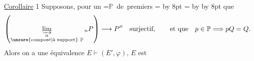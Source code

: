 \uline{Corollaire} 1 Supposons, pour un \begingroup
{}=\hbox{$\mathbb{P}$ de  premiers}
= \advance{} by 8pt
= \advance{} by  \advance{} by 8pt
\leavevmode{}%
\kern4pt\kern4pt\endgroup que
\[\left(\varinjlim_{\substack{n\\\text{\unsure{composé|à support}}\ \mathbb{P}}}{}_nP\right)\longrightarrow P''\quad\text{surjectif},\qquad\text{et que}\quad p\in\mathbb{P}\Longrightarrow pQ=Q.\]
Alors on a une équivalence $E\vdash(E',\varphi)$,  $E$ est 

